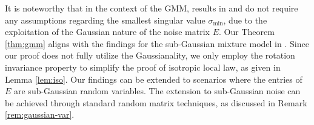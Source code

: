 \documentclass[reqno]{amsart}
\DeclareMathOperator{\rank}{rank}
\newcommand{\E}{\mathbb{E}}
\newcommand{\T}{\mathrm{T}}
\theoremstyle{plain}
\theoremstyle{definition}
\begin{document}


It is noteworthy that in the context of the GMM, results in \cite{LZZ21} and \cite{ZZ22} do not require any assumptions regarding the smallest singular value $\sigma_{\min}$, due to the exploitation of the Gaussian nature of the noise matrix $E$. Our Theorem \ref{thm:gmm} aligns with the findings for the sub-Gaussian mixture model in \cite{ZZ22}. Since our proof does not fully utilize the Gaussianality, we only employ the rotation invariance property to simplify the proof of isotropic local law, as given in Lemma \ref{lem:iso}. Our findings can be extended to scenarios where the entries of $E$ are sub-Gaussian random variables.  The extension to sub-Gaussian noise can be achieved through standard random matrix techniques, as discussed in Remark \ref{rem:gaussian-var}.
\end{document}
